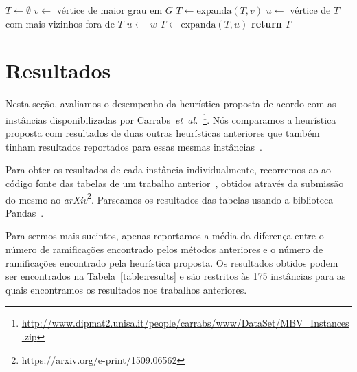 \documentclass[conference]{IEEEtran}
\begin{document}
\begin{algorithm}
  \caption{Algoritmo heur\'istico para evitar expans\~ao de v\'ertices com 2 vizinhos n\~ao expandidos.}
  \label{algo:heuristic}
    \begin{algorithmic}[1] %
            \State $T \gets \emptyset$
            \State $v \gets$ v\'ertice de maior grau em $G$
            \State $T \gets \mathrm{expanda}(T, v)$
            \State
             \label{algo:while}
              \State $u \gets$ v\'ertice de $T$ com mais vizinhos fora de $T$
               \label{algo:if}
                \State $u \gets$ $w$ 
              \EndIf
              \State $T \gets \mathrm{expanda}(T, u)$
            \EndWhile
            \State
            \State \textbf{return} $T$
        \EndProcedure
    \end{algorithmic}
\end{algorithm}

\section{Resultados}
Nesta se\c{c}\~ao, avaliamos o desempenho da heur\'istica proposta de acordo com as inst\^ancias
disponibilizadas por
Carrabs~\textit{et~al.}~\cite{carrabs2013}\footnote{\url{http://www.dipmat2.unisa.it/people/carrabs/www/DataSet/MBV\_Instances.zip}}.
N\'os comparamos a heur\'istica proposta com resultados de duas outras heur\'isticas anteriores
que tamb\'em tinham resultados reportados para essas mesmas
inst\^ancias~\cite{carrabs2013, cerulli2009, melo2016}.

Para obter os resultados de cada inst\^ancia individualmente, recorremos ao ao c\'odigo fonte das
tabelas de um trabalho anterior~\cite{melo2016}, obtidos atrav\'es da submiss\~ao do mesmo ao
\textit{arXiv}\footnote{https://arxiv.org/e-print/1509.06562}. Parseamos os resultados das tabelas
usando a biblioteca Pandas~\cite{pandas}.

Para sermos mais sucintos, apenas reportamos a m\'edia da diferen\c{c}a entre o n\'umero de ramifica\c{c}\~oes
encontrado pelos m\'etodos anteriores e o n\'umero de ramifica\c{c}\~oes encontrado pela heur\'istica proposta.
Os resultados obtidos podem ser encontrados na Tabela~\ref{table:results} e s\~ao restritos \`as 175
inst\^ancias para as quais encontramos os resultados nos trabalhos anteriores.
\end{document}
